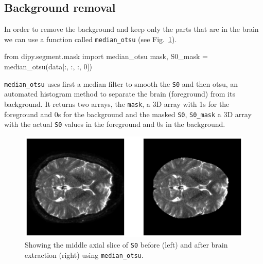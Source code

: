 \documentclass{bioinfo}
\begin{document}
\subsection{Background removal}
In order to remove the background and keep only the parts that are in the brain
we can use a function called \texttt{median\_otsu} (see Fig.~\ref{Fig:brain_segmentation}).
\begin{python}
from dipy.segment.mask import median_otsu
mask, S0_mask = median_otsu(data[:, :, :, 0])
\end{python}
\texttt{median\_otsu} uses first a median filter to smooth the \texttt{S0} and
then otsu, an automated histogram method \citep{Otsu1979} to separate the brain
(foreground) from its background. It returns two arrays, the \texttt{mask}, a
3D array with 1s for the foreground and 0s for the background and the masked
\texttt{S0}, \texttt{S0\_mask} a 3D array with the actual \texttt{S0} values in
the foreground and 0s in the background.

\begin{figure}
\includegraphics[scale=0.55]{Figures/brain_segmentation.eps}
\centering{}
\caption{Showing the middle axial slice of \texttt{S0} before (left) and after brain extraction (right) using \texttt{median\_otsu}. \label{Fig:brain_segmentation}}
\end{figure}
\end{document}
